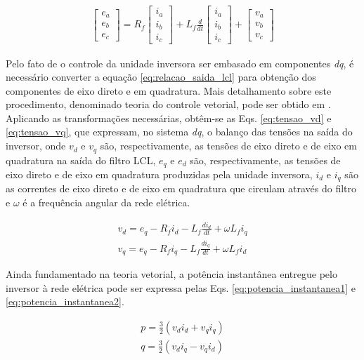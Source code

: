 \begin{align}\label{eq:relacao_saida_lcl}
	\begin{bmatrix}
		e_a \\ e_b \\ e_c
	\end{bmatrix}
	= R_f
	\begin{bmatrix}
		i_a \\ i_b \\ i_c
	\end{bmatrix}
	+ L_f\frac{d}{dt}
	\begin{bmatrix}
		i_a \\ i_b \\ i_c
	\end{bmatrix}
	+
	\begin{bmatrix}
		v_a \\ v_b \\ v_c
	\end{bmatrix}
\end{align}

Pelo fato de o controle da unidade inversora ser embasado em componentes \textit{dq}, é necessário converter a equação \ref{eq:relacao_saida_lcl} para obtenção dos componentes de eixo direto e em quadratura. Mais detalhamento sobre este procedimento, denominado teoria do controle vetorial, pode ser obtido em \cite{book-remusteodorescu201b1}. Aplicando as transformações necessárias, obtêm-se as Eqs. \ref{eq:tensao_vd} e \ref{eq:tensao_vq}, que expressam, no sistema \textit{dq}, o balanço das tensões na saída do inversor, onde $v_d$ e $v_q$ são, respectivamente, as tensões de eixo direto e de eixo em quadratura na saída do filtro LCL, $e_q$ e $e_d$ são, respectivamente, as tensões de eixo direto e de eixo em quadratura produzidas pela unidade inversora, $i_d$ e $i_q$ são as correntes de eixo direto e de eixo em quadratura que circulam através do filtro e $\omega$ é a frequência angular da rede elétrica.

\begin{align}
	v_d = e_q - R_fi_d - L_f \frac{di_d}{dt} + \omega L_fi_q\label{eq:tensao_vd}\\
	v_q = e_q - R_fi_q - L_f\frac{di_q}{dt} + \omega L_fi_d\label{eq:tensao_vq}
\end{align}

Ainda fundamentado na teoria vetorial, a potência instantânea entregue pelo inversor à rede elétrica pode ser expressa pelas Eqs. \ref{eq:potencia_instantanea1} e \ref{eq:potencia_instantanea2}. 

\begin{align}
	p = \frac{3}{2}(v_di_d + v_qi_q)\label{eq:potencia_instantanea1}\\
	q = \frac{3}{2}(v_di_q - v_qi_d)\label{eq:potencia_instantanea2}
\end{align}

